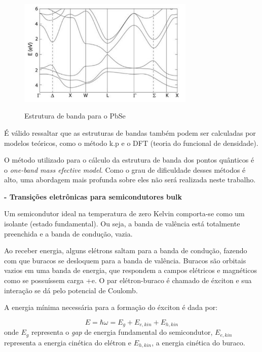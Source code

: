		\begin{figure}[H]
	      \caption{Estrutura de banda para o PbSe}
	      \centering
	      \includegraphics[width=0.75\textwidth]{images/figura7.jpg}
	      \label{fig7}
	    \end{figure}

		\par É válido ressaltar que  as estruturas de bandas também podem ser calculadas por modelos teóricos, como o método k.p e o DFT (teoria do funcional de densidade).

		\par O método utilizado para o cálculo da estrutura de banda dos pontos quânticos é o \textit{one-band mass efective model}\cite{bulk2}. Como o  grau de dificuldade desses métodos é alto, uma abordagem mais profunda sobre eles não será realizada neste trabalho.

	\par \textbf{- Transições eletrônicas para semicondutores bulk}

		\par Um semicondutor ideal na temperatura de zero Kelvin comporta-se como um isolante (estado fundamental). Ou seja, a banda de valência está totalmente preenchida e a banda de condução, vazia.
 		
 		\par Ao receber energia, alguns elétrons saltam para a banda de condução, fazendo com que buracos se desloquem para a banda de valência\cite{bloch1}. Buracos são orbitais vazios em uma banda de energia, que respondem a campos elétricos e magnéticos como se possuíssem carga +e\cite{qm_fis6}. O par elétron-buraco é chamado de éxciton e sua interação se dá pelo potencial de Coulomb\cite{bloch1}.

 		\par A energia mínima necessária para a formação do éxciton é dada por:

 		\begin{equation}
 			\label{bandas_1}
 			E = \hbar \omega = E_{g} + E_{e, kin} + E_{h, kin}
 		\end{equation}
 		onde $E_{g}$ representa o \textit{gap} de energia fundamental do semicondutor, $E_{e,kin}$ representa a energia cinética do elétron e $E_{h,kin}$, a energia cinética do buraco.

